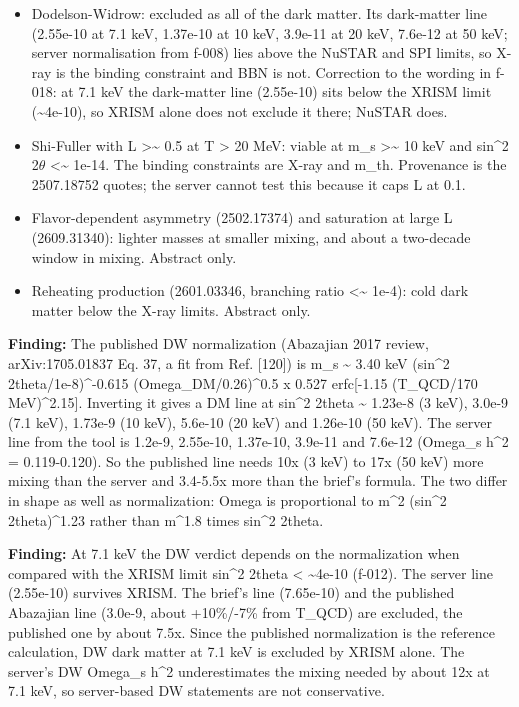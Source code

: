 \documentclass[11pt,a4paper]{article}
\begin{document}
\begin{itemize}
  \item Dodelson-Widrow: excluded as all of the dark matter. Its dark-matter line (2.55e-10 at 7.1 keV, 1.37e-10 at 10 keV, 3.9e-11 at 20 keV, 7.6e-12 at 50 keV; server normalisation from f-008) lies above the NuSTAR and SPI limits, so X-ray is the binding constraint and BBN is not. Correction to the wording in f-018: at 7.1 keV the dark-matter line (2.55e-10) sits below the XRISM limit (\textasciitilde{}4e-10), so XRISM alone does not exclude it there; NuSTAR does.
  \item Shi-Fuller with L \textgreater{}\textasciitilde{} 0.5 at T \textgreater{} 20 MeV: viable at m\_s \textgreater{}\textasciitilde{} 10 keV and sin\textasciicircum{}2 2$\theta$ \textless{}\textasciitilde{} 1e-14. The binding constraints are X-ray and m\_th. Provenance is the 2507.18752 quotes; the server cannot test this because it caps L at 0.1.
  \item Flavor-dependent asymmetry (2502.17374) and saturation at large L (2609.31340): lighter masses at smaller mixing, and about a two-decade window in mixing. Abstract only.
  \item Reheating production (2601.03346, branching ratio \textless{}\textasciitilde{} 1e-4): cold dark matter below the X-ray limits. Abstract only.
\end{itemize}
\textbf{Finding:} The published DW normalization (Abazajian 2017 review, arXiv:1705.01837 Eq. 37, a fit from Ref. [120]) is m\_s \textasciitilde{} 3.40 keV (sin\textasciicircum{}2 2theta/1e-8)\textasciicircum{}-0.615 (Omega\_DM/0.26)\textasciicircum{}0.5 x 0.527 erfc[-1.15 (T\_QCD/170 MeV)\textasciicircum{}2.15]. Inverting it gives a DM line at sin\textasciicircum{}2 2theta \textasciitilde{} 1.23e-8 (3 keV), 3.0e-9 (7.1 keV), 1.73e-9 (10 keV), 5.6e-10 (20 keV) and 1.26e-10 (50 keV). The server line from the tool is 1.2e-9, 2.55e-10, 1.37e-10, 3.9e-11 and 7.6e-12 (Omega\_s h\textasciicircum{}2 = 0.119-0.120). So the published line needs 10x (3 keV) to 17x (50 keV) more mixing than the server and 3.4-5.5x more than the brief's formula. The two differ in shape as well as normalization: Omega is proportional to m\textasciicircum{}2 (sin\textasciicircum{}2 2theta)\textasciicircum{}1.23 rather than m\textasciicircum{}1.8 times sin\textasciicircum{}2 2theta.

\textbf{Finding:} At 7.1 keV the DW verdict depends on the normalization when compared with the XRISM limit sin\textasciicircum{}2 2theta \textless{} \textasciitilde{}4e-10 (f-012). The server line (2.55e-10) survives XRISM. The brief's line (7.65e-10) and the published Abazajian line (3.0e-9, about +10\%/-7\% from T\_QCD) are excluded, the published one by about 7.5x. Since the published normalization is the reference calculation, DW dark matter at 7.1 keV is excluded by XRISM alone. The server's DW Omega\_s h\textasciicircum{}2 underestimates the mixing needed by about 12x at 7.1 keV, so server-based DW statements are not conservative.
\end{document}
